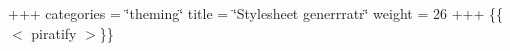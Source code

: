 +++ categories = \char`\"{}theming\char`\"{} title = \char`\"{}\+Stylesheet generrrat\textquotesingle{}r\char`\"{} weight = 26 +++ \{\{$<$ piratify $>$\}\} 